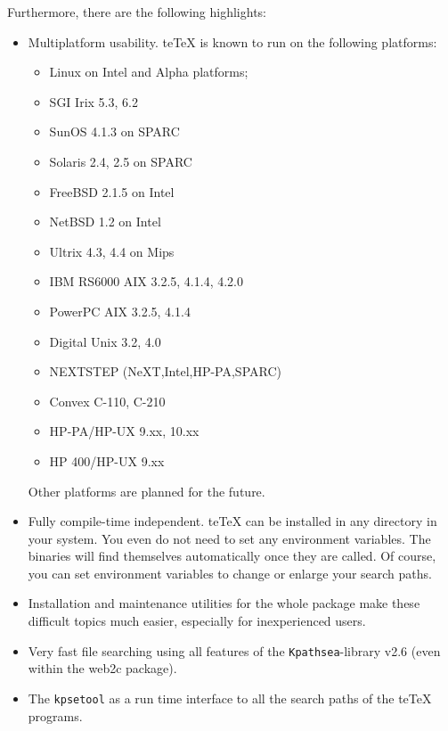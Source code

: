 \documentclass[12pt,a4paper]{article}
\newcommand{\teTeX}{\textrm{te}\TeX\xspace}
\begin{document}
\medskip

Furthermore, there are the following highlights:

\begin{itemize}

\item Multiplatform usability. \teTeX{} is known to run on the following
platforms: 

\begin{itemize}
\item Linux on Intel and Alpha platforms;
\item SGI Irix 5.3, 6.2
\item SunOS 4.1.3 on SPARC
\item Solaris 2.4, 2.5 on SPARC
\item FreeBSD 2.1.5 on Intel
\item NetBSD 1.2 on Intel
\item Ultrix 4.3, 4.4 on Mips
\item IBM RS6000 AIX 3.2.5, 4.1.4, 4.2.0
\item PowerPC AIX 3.2.5, 4.1.4
\item Digital Unix 3.2, 4.0
\item NEXTSTEP (NeXT,Intel,HP-PA,SPARC)
\item Convex C-110, C-210
\item HP-PA/HP-UX 9.xx, 10.xx
\item HP 400/HP-UX 9.xx
\end{itemize}

Other platforms are planned for the future.

\item Fully compile-time independent. \teTeX{} can be
  installed in any directory in your system. You even do not
  need to set any environment variables. The binaries will
  find themselves automatically once they are called.  Of
  course, you can set environment variables to change or
  enlarge your search paths.
  
\item Installation and maintenance utilities for the whole
  package make these difficult topics much easier,
  especially for inexperienced users.
  
\item Very fast file searching using all features of the
  {\tt Kpathsea}-library v2.6 (even within the web2c
  package).
  
\item The {\tt kpsetool} as a run time interface to all the
  search paths of the \teTeX{} programs.
  

\end{itemize}
\end{document}
